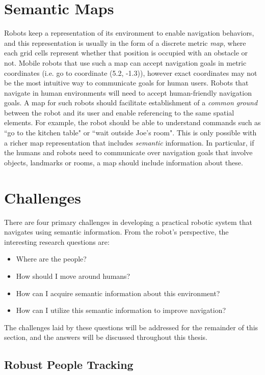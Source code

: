 \section{Semantic Maps}
\label{sec:semantic_maps}

Robots keep a representation of its environment to enable navigation behaviors, and this representation is usually in the form of a discrete metric \textit{map}, where each grid cells represent whether that position is occupied with an obstacle or not. Mobile robots that use such a map can accept navigation goals in metric coordinates (i.e. go to coordinate (5.2, -1.3)), however exact coordinates may not be the most intuitive way to communicate goals for human users. Robots that navigate in human environments will need to accept human-friendly navigation goals. A map for such robots should facilitate establishment of a \textit{common ground} between the robot and its user and enable referencing to the same spatial elements. For example, the robot should be able to understand commands such as ``go to the kitchen table" or ``wait outside Joe's room". This is only possible with a richer map representation that includes \textit{semantic} information. In particular, if the humans and robots need to communicate over navigation goals that involve objects, landmarks or rooms, a map should include information about these.

\section{Challenges}

There are four primary challenges in developing a practical robotic system that navigates using semantic information. From the robot's perspective, the interesting research questions are:

\begin{itemize}
\item Where are the people?
\item How should I move around humans?
\item How can I acquire semantic information about this environment?
\item How can I utilize this semantic information to improve navigation?
\end{itemize}

The challenges laid by these questions will be addressed for the remainder of this section, and the answers will be discussed throughout this thesis.

\subsection{Robust People Tracking}

